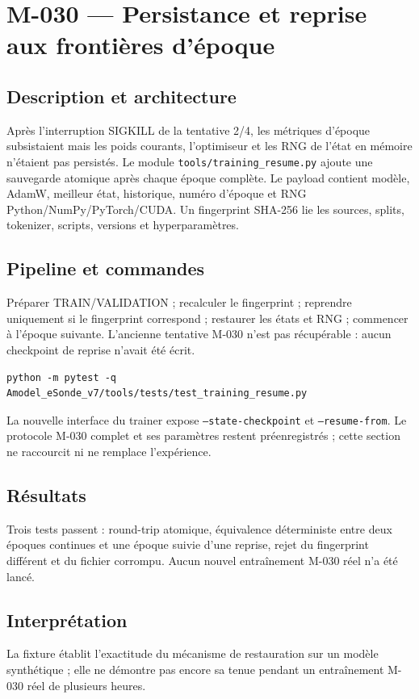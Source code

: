 \documentclass[11pt,a4paper]{report}
\begin{document}
\section{M-030 — Persistance et reprise aux frontières d’époque}
\label{sec:m030-resume-state}
\subsection{Description et architecture}
Après l’interruption SIGKILL de la tentative 2/4, les métriques d’époque subsistaient mais les poids courants, l’optimiseur et les RNG de l’état en mémoire n’étaient pas persistés. Le module \texttt{tools/training\_resume.py} ajoute une sauvegarde atomique après chaque époque complète. Le payload contient modèle, AdamW, meilleur état, historique, numéro d’époque et RNG Python/NumPy/PyTorch/CUDA. Un fingerprint SHA-256 lie les sources, splits, tokenizer, scripts, versions et hyperparamètres.
\subsection{Pipeline et commandes}
Préparer TRAIN/VALIDATION ; recalculer le fingerprint ; reprendre uniquement si le fingerprint correspond ; restaurer les états et RNG ; commencer à l’époque suivante. L’ancienne tentative M-030 n’est pas récupérable : aucun checkpoint de reprise n’avait été écrit.
\begin{verbatim}
python -m pytest -q Amodel_eSonde_v7/tools/tests/test_training_resume.py
\end{verbatim}
La nouvelle interface du trainer expose \texttt{--state-checkpoint} et \texttt{--resume-from}. Le protocole M-030 complet et ses paramètres restent préenregistrés ; cette section ne raccourcit ni ne remplace l’expérience.
\subsection{Résultats}
Trois tests passent : round-trip atomique, équivalence déterministe entre deux époques continues et une époque suivie d’une reprise, rejet du fingerprint différent et du fichier corrompu. Aucun nouvel entraînement M-030 réel n’a été lancé.
\subsection{Interprétation}
La fixture établit l’exactitude du mécanisme de restauration sur un modèle synthétique ; elle ne démontre pas encore sa tenue pendant un entraînement M-030 réel de plusieurs heures.
\end{document}
